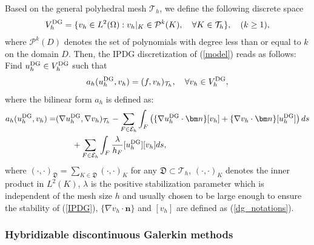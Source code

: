 \documentclass[1996/10/24]{amsart}
\theoremstyle{definition}
\numberwithin{equation}{section}
\begin{document}
Based on the general polyhedral mesh $\mathcal{T}_h$, we define the following discrete space
\begin{align*}
V_h^{{\rm DG}}=\{v_h\in L^2(\Omega): v_h|_K\in\mathcal{P}^k(K),\quad \forall K\in\mathcal{T}_h\},
\quad (k \geq 1),
\end{align*}
where $\mathcal{P}^k(D)$ denotes the set of polynomials with degree less than or equal to $k$ on the domain $D$.
Then, the IPDG discretization of (\ref{model}) reads as follows: Find $u_h^{\rm DG}\in V_h^{{\rm DG}}$ such that
\begin{align}
\label{IPDG}
a_h(u_h^{{\rm DG}},v_h)=(f,v_h)_{\mathcal{T}_h},\quad \forall v_h\in V_h^{{\rm DG}},
\end{align}
where the bilinear form $a_h$ is defined as:
\begin{align*}
a_h(u_h^{{\rm DG}},v_h)
= & (\nabla u_h^{{\rm DG}},\nabla v_h)_{\mathcal{T}_h}
-\sum_{F\in\mathcal{E}_h}\int_F \left( \{\nabla u_h^{{\rm DG}}\cdot{\bm n}\}[v_h]
+\{\nabla v_h\cdot{\bm n}\}[u_h^{{\rm DG}}] \right) ds \\
& \qquad + \sum_{F\in\mathcal{E}_h} \int_{F} \frac{\lambda}{h_F}[u_h^{{\rm DG}}][v_h] ds,
\end{align*}
where $(\cdot,\cdot)_{\mathfrak{D}}=\sum_{K\in\mathfrak{D}}(\cdot,\cdot)_K$ for any $\mathfrak{D}\subset\mathcal{T}_h$, $(\cdot,\cdot)_K$ denotes the inner product in $L^2(K)$, $\lambda$ is the positive stabilization parameter which is independent of the mesh size $h$ and usually chosen to be
large enough to ensure the stability of (\ref{IPDG}),
$\{\nabla v_h\cdot{\bm n}\}$ and $[v_h]$ are defined as (\ref{dg_notations}).

\subsubsection{Hybridizable discontinuous Galerkin methods}
\end{document}
